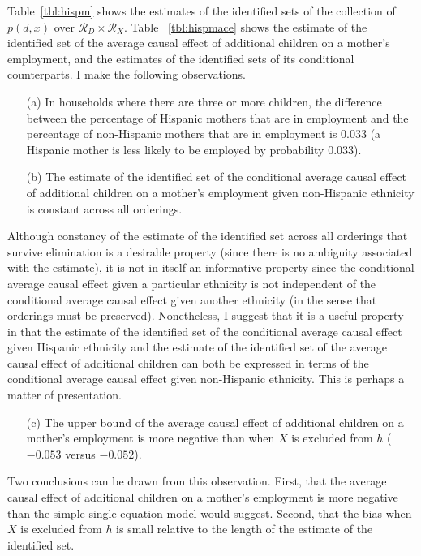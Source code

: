 \documentclass[12pt,a4paper,twoside]{article}
\numberwithin{equation}{section}
\begin{document}
Table~\ref{tbl:hispm} shows the estimates of the identified sets of the collection of $p(d,x)$ over $\mathcal{R}_D\times\mathcal{R}_X$. Table ~\ref{tbl:hispmace} shows the estimate of the identified set of the average causal effect of additional children on a mother's employment, and the estimates of the identified sets of its conditional counterparts. I make the following observations.
\begin{enumerate}
\item[(a)] In households where there are three or more children, the difference between the percentage of Hispanic mothers that are in employment and the percentage of non-Hispanic mothers that are in employment is $0.033$ (a Hispanic mother is less likely to be employed by probability $0.033$).
\end{enumerate}
\begin{enumerate}
\item[(b)] The estimate of the identified set of the conditional average causal effect of additional children on a mother's employment given non-Hispanic ethnicity is constant across all orderings.
\end{enumerate}
Although constancy of the estimate of the identified set across all orderings that survive elimination is a desirable property (since there is no ambiguity associated with the estimate), it is not in itself an informative property since the conditional average causal effect given a particular ethnicity is not independent of the conditional average causal effect given another ethnicity (in the sense that orderings must be preserved). Nonetheless, I suggest that it is a useful property in that the estimate of the identified set of the conditional average causal effect given Hispanic ethnicity and the estimate of the identified set of the average causal effect of additional children can both be expressed in terms of the conditional average causal effect given non-Hispanic ethnicity. This is perhaps a matter of presentation.
\begin{enumerate}
\item[(c)] The upper bound of the average causal effect of additional children on a mother's employment is more negative than when $X$ is excluded from $h$ ($-0.053$ versus $-0.052$). 
\end{enumerate}
Two conclusions can be drawn from this observation. First, that the average causal effect of additional children on a mother's employment is more negative than the simple single equation model would suggest. Second, that the bias when $X$ is excluded from $h$ is small relative to the length of the estimate of the identified set.
\end{document}
